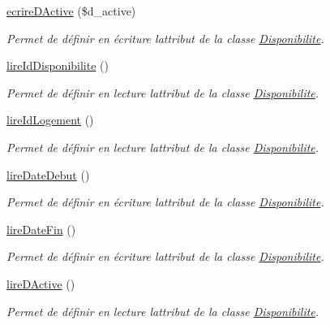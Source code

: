 \begin{DoxyCompactItemize}
\hyperlink{class_disponibilite_a8311a11dac8624c1682eb49aeaf37c07}{ecrire\+D\+Active} (\$d\+\_\+active)
\begin{DoxyCompactList}\small\item\em Permet de définir en écriture l\textquotesingle{}attribut de la classe \hyperlink{class_disponibilite}{Disponibilite}. \end{DoxyCompactList}\item 
\hyperlink{class_disponibilite_a31e4f245de8b4fac3ac59c20b9fb5a32}{lire\+Id\+Disponibilite} ()
\begin{DoxyCompactList}\small\item\em Permet de définir en lecture l\textquotesingle{}attribut de la classe \hyperlink{class_disponibilite}{Disponibilite}. \end{DoxyCompactList}\item 
\hyperlink{class_disponibilite_a88de95c77a8d7002512de69fb198ce14}{lire\+Id\+Logement} ()
\begin{DoxyCompactList}\small\item\em Permet de définir en lecture l\textquotesingle{}attribut de la classe \hyperlink{class_disponibilite}{Disponibilite}. \end{DoxyCompactList}\item 
\hyperlink{class_disponibilite_a367f35c44bfb76cc57463a86c5009e24}{lire\+Date\+Debut} ()
\begin{DoxyCompactList}\small\item\em Permet de définir en écriture l\textquotesingle{}attribut de la classe \hyperlink{class_disponibilite}{Disponibilite}. \end{DoxyCompactList}\item 
\hyperlink{class_disponibilite_a6e4423f8f7aacf4eb33167d714a77d17}{lire\+Date\+Fin} ()
\begin{DoxyCompactList}\small\item\em Permet de définir en écriture l\textquotesingle{}attribut de la classe \hyperlink{class_disponibilite}{Disponibilite}. \end{DoxyCompactList}\item 
\hyperlink{class_disponibilite_a30533f5341c48c773bc415b4f1eec391}{lire\+D\+Active} ()
\begin{DoxyCompactList}\small\item\em Permet de définir en lecture l\textquotesingle{}attribut de la classe \hyperlink{class_disponibilite}{Disponibilite}. \end{DoxyCompactList}\end{DoxyCompactItemize}


